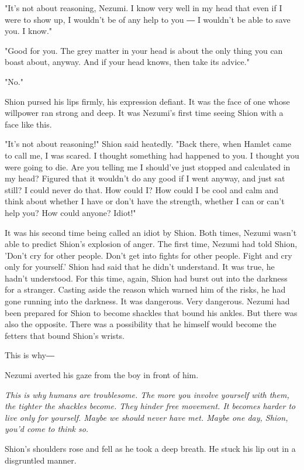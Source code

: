 "It's not about reasoning, Nezumi. I know very well in my head that even
if I were to show up, I wouldn't be of any help to you ― I wouldn't be
able to save you. I know."

"Good for you. The grey matter in your head is about the only thing you
can boast about, anyway. And if your head knows, then take its advice."

"No."

Shion pursed his lips firmly, his expression defiant. It was the face of
one whose willpower ran strong and deep. It was Nezumi's first time
seeing Shion with a face like this.

"It's not about reasoning!" Shion said heatedly. "Back there, when
Hamlet came to call me, I was scared. I thought something had happened
to you. I thought you were going to die. Are you telling me I should've
just stopped and calculated in my head? Figured that it wouldn't do any
good if I went anyway, and just sat still? I could never do that. How
could I? How could I be cool and calm and think about whether I have or
don't have the strength, whether I can or can't help you? How could
anyone? Idiot!"

It was his second time being called an idiot by Shion. Both times,
Nezumi wasn't able to predict Shion's explosion of anger. The first
time, Nezumi had told Shion, 'Don't cry for other people. Don't get into
fights for other people. Fight and cry only for yourself.' Shion had
said that he didn't understand. It was true, he hadn't understood. For
this time, again, Shion had burst out into the darkness for a stranger.
Casting aside the reason which warned him of the risks, he had gone
running into the darkness. It was dangerous. Very dangerous. Nezumi had
been prepared for Shion to become shackles that bound his ankles. But
there was also the opposite. There was a possibility that he himself
would become the fetters that bound Shion's wrists.

This is why―

Nezumi averted his gaze from the boy in front of him.

\emph{This is why humans are troublesome. The more you involve yourself with
them, the tighter the shackles become. They hinder free movement. It
becomes harder to live only for yourself. Maybe we should never have
met. Maybe one day, Shion, you'd come to think so.}

Shion's shoulders rose and fell as he took a deep breath. He stuck his
lip out in a disgruntled manner.


